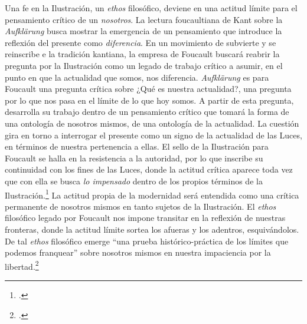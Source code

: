 Una fe en la Ilustración, un \emph{ethos} filosófico, deviene en una actitud límite para el pensamiento crítico de un \emph{nosotros}. La lectura foucaultiana de Kant sobre la \emph{Aufklärung} busca mostrar la emergencia de un pensamiento que introduce la reflexión del presente como \emph{diferencia}. En un movimiento de subvierte y se reinscribe e la tradición kantiana, la empresa de Foucault buscará reabrir la pregunta por la Ilustración como un legado de trabajo crítico a asumir, en el punto en que la actualidad que somos, nos diferencia. \emph{Aufklärung} es para Foucault una pregunta crítica sobre ¿Qué es nuestra actualidad?, una pregunta por lo que nos pasa en el límite de lo que hoy somos. A partir de esta pregunta, desarrolla su trabajo dentro de un pensamiento crítico que tomará la forma de una ontología de nosotros mismos, de una ontología de la actualidad. La cuestión gira en torno a interrogar el presente como un signo de la actualidad de las Luces, en términos de nuestra pertenencia a ellas. El sello de la Ilustración para Foucault se halla en la resistencia a la autoridad, por lo que inscribe su continuidad con los fines de las Luces, donde la actitud crítica aparece toda vez que con ella se busca \emph{lo impensado} dentro de los propios términos de la Ilustración.\footcite[][]{@7036-BUTLER2001} La actitud propia de la modernidad será entendida como una crítica permanente de nosotros mismos en tanto sujetos de la Ilustración. El \emph{ethos} filosófico legado por Foucault nos impone transitar en la reflexión de nuestras fronteras, donde la actitud límite sortea los afueras y los adentros, esquivándolos. De tal \emph{ethos} filosófico emerge \enquote{una prueba histórico-práctica de los límites que podemos franquear} sobre nosotros mismos en nuestra impaciencia por la libertad.\footcite[][104]{@7037-FOUCAULT2002}

